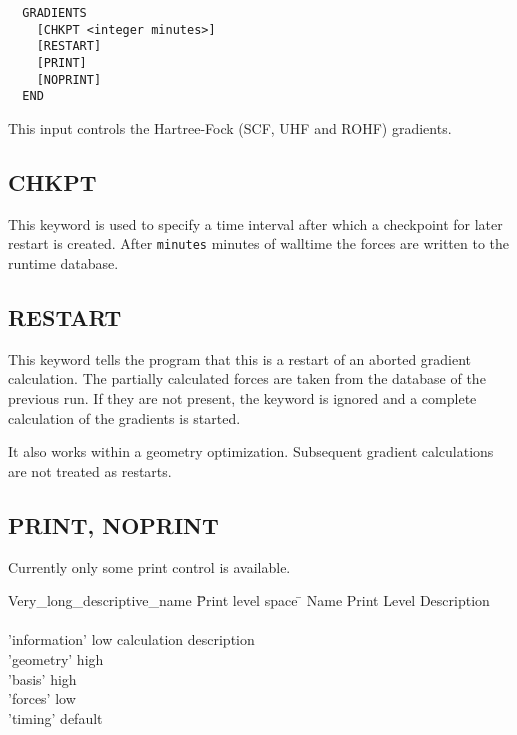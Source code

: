 \begin{verbatim}
  GRADIENTS 
    [CHKPT <integer minutes>]
    [RESTART]
    [PRINT]
    [NOPRINT]
  END
\end{verbatim}

  This input controls the Hartree-Fock (SCF, UHF and ROHF) gradients.  

\subsection{CHKPT}

  This keyword is used to specify a time interval after which a
  checkpoint for later restart is created. After \verb+minutes+
  minutes of walltime the forces are written to the runtime database.

\subsection{RESTART}

  This keyword tells the program that this is a restart of an aborted
  gradient calculation. The partially calculated forces are taken from
  the database of the previous run. If they are not present, the
  keyword is ignored and a complete calculation of the gradients is started.

  It also works within a geometry optimization. Subsequent gradient 
  calculations are not treated as restarts.

\subsection{PRINT, NOPRINT}

  Currently only some print control is available.

\begin{tabbing}
  Very\_long\_descriptive\_name \= Print level space \= \kill
  Name                   \> Print Level \> Description \\
                         \>        \> \\
        'information'   \>        low  \> calculation description\\
        'geometry'    \>          high \> \\
        'basis'        \>         high \> \\
        'forces'   \>             low \> \\
        'timing'   \>             default \> 
\end{tabbing}

